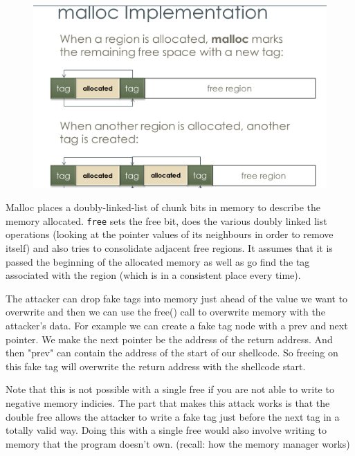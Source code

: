 \documentclass[../notes.tex]{subfiles}
\begin{document}
\begin{figure}[H]
    \centering
    \includegraphics[width=0.8\linewidth]{img/image_2023-01-16-20-09-02.png}
\end{figure}

Malloc places a doubly-linked-list of chunk bits in memory to describe the memory allocated. \texttt{free} sets the free bit, does the various doubly linked list operations (looking at the pointer values of its neighbours in order to remove itself) and also tries to consolidate adjacent free regions.
It assumes that it is passed the beginning of the allocated memory as well as go find the tag associated with the region (which is in a consistent place every time).

The attacker can drop fake tags into memory just ahead of the value we want to overwrite and then we can use the free() call to overwrite memory with the attacker's data.
For example we can create a fake tag node with a prev and next pointer. We make the next pointer be the address of the return address. And then "prev" can contain the address of the start of our shellcode. So freeing on this fake tag will overwrite the return address with the shellcode start.



\begin{blockquote}
    Note that this is not possible with a single free if you are not able to write to negative memory indicies. 
    The part that makes this attack works is that the double free allows the attacker to write a fake tag just before the next tag in a totally valid way. Doing this with a single free would also involve writing to memory that the program doesn't own. (recall: how the memory manager works)
    

\end{blockquote}
\end{document}
